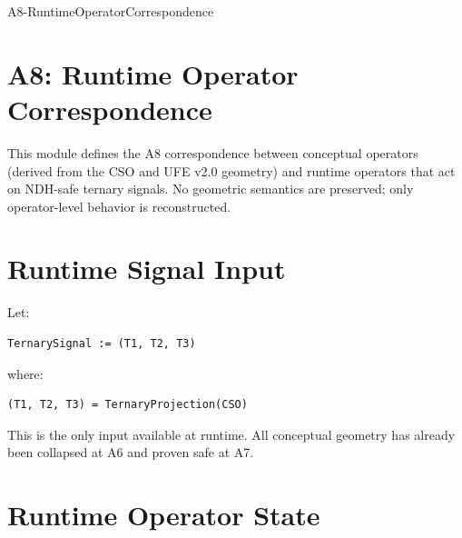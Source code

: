 \documentclass[11pt]{article}
\begin{document}


\begin{citationmembrane}{A8-RuntimeOperatorCorrespondence}
\end{citationmembrane}

\section*{A8: Runtime Operator Correspondence}

This module defines the A8 correspondence between conceptual operators
(derived from the CSO and UFE v2.0 geometry) and runtime operators that act
on NDH-safe ternary signals. No geometric semantics are preserved; only
operator-level behavior is reconstructed.

\newpage


\section{Runtime Signal Input}

Let:

\begin{verbatim}
TernarySignal := (T1, T2, T3)
\end{verbatim}

where:

\begin{verbatim}
(T1, T2, T3) = TernaryProjection(CSO)
\end{verbatim}

This is the only input available at runtime.  
All conceptual geometry has already been collapsed at A6 and proven safe at A7.

\newpage


\section{Runtime Operator State}
\end{document}
